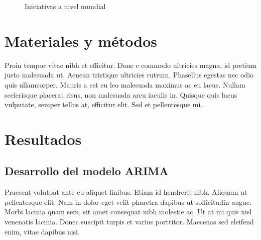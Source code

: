\documentclass[artMGITG,SIG,accept,moreauthors,font4]{mgitg}%
\begin{document}
\begin{figure}[!ht]
    \centering
    \hfill
    \caption{Iniciativas a nivel mundial}
    \label{fig3}
\end{figure}


\section{Materiales y métodos}
%
\noindent
Proin tempor vitae nibh et efficitur. Done c commodo ultricies magna, id pretium justo malesuada ut. Aenean tristique ultricies rutrum. Phasellus egestas nec odio quis ullamcorper. Mauris a est eu leo malesuada maximus ac eu lacus. Nullam scelerisque placerat risus, non malesuada arcu iaculis in. Quisque quis lacus vulputate, semper tellus at, efficitur elit. Sed et pellentesque mi.

\section{Resultados}
%
\unskip
\subsection{Desarrollo del modelo ARIMA} 
%
\noindent
Praesent volutpat ante eu aliquet finibus. Etiam id hendrerit nibh. Aliquam ut pellentesque elit. Nam in dolor eget velit pharetra dapibus ut sollicitudin augue. Morbi lacinia quam sem, sit amet consequat nibh molestie ac. Ut at mi quis nisl venenatis lacinia. Donec suscipit turpis et varius porttitor. Maecenas sed eleifend enim, vitae dapibus nisi.
\end{document}
